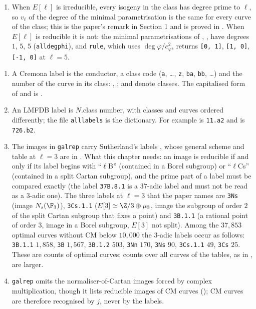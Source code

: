 \begin{sloppypar}
\begin{remark}
\begin{enumerate}[label=(\roman*)]
\texttt{opt\_man} records it ().
\item When $E[\ell]$ is irreducible, every isogeny in the class has degree prime to $\ell$, so $v_\ell$ of the degree of the minimal
parametrisation is the same for every curve of the class; this is the paper's remark in Section 1 and is proved in . When
$E[\ell]$ is reducible it is not: the minimal parametrisations of , ,  have degrees $1$, $5$, $5$ (\texttt{alldegphi}), and
\texttt{rule}, which uses $\deg\varphi/c_\varphi^2$, returns \texttt{[0, 1]}, \texttt{[1, 0]}, \texttt{[-1, 0]} at $\ell=5$.
\end{enumerate}
\end{remark}

\begin{convention}[labels]\label{conv:computation:labels}
\begin{enumerate}[label=(\roman*)]
\item A Cremona label is the conductor, a class code (\texttt{a}, \dots, \texttt{z}, \texttt{ba}, \texttt{bb}, \dots) and the number of the curve in its
class: , ;  and  denote classes. The capitalised form  of \cite{Cremona97} and \cite{ARS12} is
.
\item An LMFDB label \cite{LMFDB} is $N$.class number, with classes and curves ordered differently; the file \texttt{alllabels} is the
dictionary. For example  is \texttt{11.a2} and  is \texttt{726.b2}.
\item The images in \texttt{galrep} carry Sutherland's labels \cite{Sutherland16}, whose general scheme and table at $\ell=3$ are in
. What this chapter needs: an image is reducible if and only if its label begins with ``$\ell$B'' (contained in a Borel
subgroup) or ``$\ell$Cs'' (contained in a split Cartan subgroup), and the prime part of a label must be compared exactly (the label
\texttt{37B.8.1} is a $37$-adic label and must not be read as a $3$-adic one). The three labels at $\ell=3$ that the paper names are \texttt{3Ns}
(image $N_s(\F_3)$), \texttt{3Cs.1.1} ($E[3]\simeq\Z/3\oplus\mu_3$, image the subgroup of order $2$ of the split Cartan subgroup that fixes a point) and
\texttt{3B.1.1} (a rational point of order $3$, image in a Borel subgroup, $E[3]$ not split). Among the $37{,}853$ optimal curves without CM below
$10{,}000$ the $3$-adic labels occur as follows: \texttt{3B.1.1} $1{,}858$, \texttt{3B} $1{,}567$, \texttt{3B.1.2} $503$, \texttt{3Nn} $170$, \texttt{3Ns} $90$,
\texttt{3Cs.1.1} $49$, \texttt{3Cs} $25$. These are counts of optimal curves; counts over all curves of the tables, as in , are larger.
\item \texttt{galrep} omits the normaliser-of-Cartan images forced by complex multiplication, though it lists reducible images of CM curves
(); CM curves are therefore recognised by $j$, never by the labels.
\end{enumerate}
\end{convention}


\end{sloppypar}
